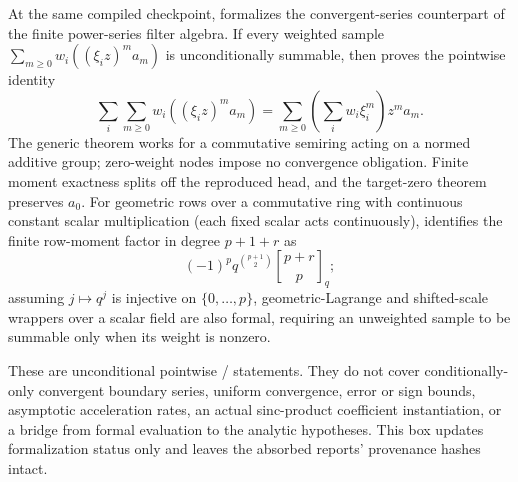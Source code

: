 \documentclass[11pt,oneside]{article}
\theoremstyle{definition}
\theoremstyle{remark}
\newcommand{\1}{\mathbf 1}
\begin{document}
\begin{statusbox}
At the same compiled checkpoint,  formalizes the convergent-series counterpart of
the finite power-series filter algebra.  If every weighted sample
\(
  \sum_{m\ge0}w_i((\xi_i z)^m a_m)
\)
is unconditionally summable, then
 proves the pointwise identity
\begin{equation}
 \sum_i\sum_{m\ge0}w_i((\xi_i z)^m a_m)
 =\sum_{m\ge0}\left(\sum_iw_i\xi_i^m\right)z^m a_m.
 \label{p0:eq:analytic-series-filter-diagonal}
\end{equation}
The generic theorem works for a commutative semiring acting on a normed additive group;
zero-weight nodes impose no convergence obligation.  Finite moment exactness splits off the
reproduced head, and the target-zero theorem preserves $a_0$.  For geometric rows over a
commutative ring with continuous constant scalar multiplication (each fixed scalar acts
continuously),
 identifies the
finite row-moment factor in degree $p+1+r$ as
\begin{equation}
 (-1)^p q^{\binom{p+1}{2}}
 \genfrac{[}{]}{0pt}{}{p+r}{p}_{q};
 \label{p0:eq:analytic-series-filter-gaussian-tail}
\end{equation}
assuming $j\mapsto q^j$ is injective on $\{0,\ldots,p\}$, geometric-Lagrange and
shifted-scale wrappers over a scalar field are also formal, requiring an unweighted sample
to be summable only when its weight is nonzero.

These are unconditional pointwise / statements.  They do not
cover conditionally-only convergent boundary series, uniform convergence, error or sign
bounds, asymptotic acceleration rates, an actual sinc-product coefficient instantiation, or
a bridge from formal  evaluation to the analytic hypotheses.  This box
updates formalization status only and leaves the absorbed reports' provenance hashes intact.
\end{statusbox}
\end{document}
